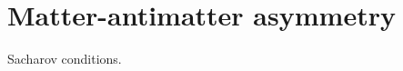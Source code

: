 \documentclass[main.tex]{subfiles}
\begin{document}
\section{Matter-antimatter asymmetry}


Sacharov conditions. 
\end{document}
